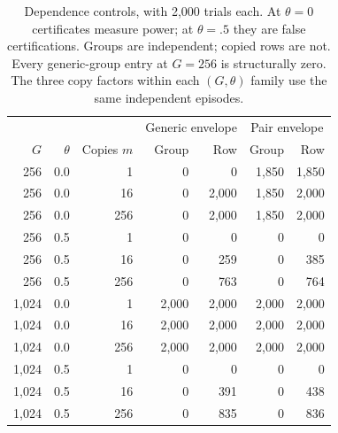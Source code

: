 \begin{table}[tb]
\centering\small
\caption{Dependence controls, with 2,000 trials each. At $\theta=0$ certificates measure power; at $\theta=.5$ they are false certifications. Groups are independent; copied rows are not. Every generic-group entry at $G=256$ is structurally zero. The three copy factors within each $(G,\theta)$ family use the same independent episodes.}\label{tab:dup}
\begin{tabular}{@{}rrr rrrr@{}}
\toprule
&&&\multicolumn{2}{c}{Generic envelope}&\multicolumn{2}{c}{Pair envelope}\\
$G$&$\theta$&Copies $m$&Group&Row&Group&Row\\
\midrule
256 & 0.0 & 1 & 0 & 0 & 1,850 & 1,850\\
256 & 0.0 & 16 & 0 & 2,000 & 1,850 & 2,000\\
256 & 0.0 & 256 & 0 & 2,000 & 1,850 & 2,000\\
256 & 0.5 & 1 & 0 & 0 & 0 & 0\\
256 & 0.5 & 16 & 0 & 259 & 0 & 385\\
256 & 0.5 & 256 & 0 & 763 & 0 & 764\\
1,024 & 0.0 & 1 & 2,000 & 2,000 & 2,000 & 2,000\\
1,024 & 0.0 & 16 & 2,000 & 2,000 & 2,000 & 2,000\\
1,024 & 0.0 & 256 & 2,000 & 2,000 & 2,000 & 2,000\\
1,024 & 0.5 & 1 & 0 & 0 & 0 & 0\\
1,024 & 0.5 & 16 & 0 & 391 & 0 & 438\\
1,024 & 0.5 & 256 & 0 & 835 & 0 & 836\\
\bottomrule\end{tabular}\end{table}
